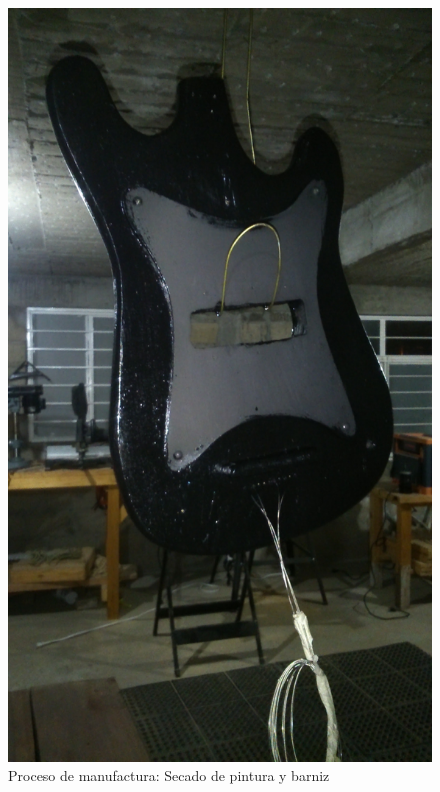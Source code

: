 \begin{figure}[!htbp]
\caption{Proceso de manufactura: Secado de pintura y barniz}
\centering
\includegraphics [scale=0.1,angle=-90]{./img/DSC_0006.JPG}
\end{figure}

\pagebreak